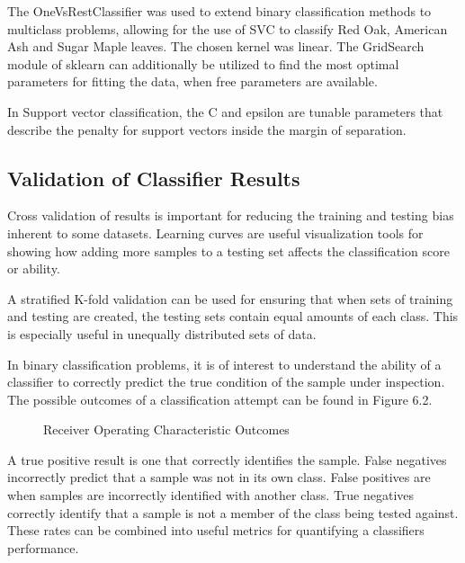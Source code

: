 %
The OneVsRestClassifier was used to extend binary classification methods to multiclass problems, allowing for the use of SVC to classify Red Oak, American Ash and Sugar Maple leaves.  The chosen kernel was linear.  The GridSearch module of sklearn can additionally be utilized to find the most optimal parameters for fitting the data, when free parameters are available.

In Support vector classification, the C and epsilon are tunable parameters that describe the penalty for support vectors inside the margin of separation.
\subsection{Validation of Classifier Results}
Cross validation of results is important for reducing the training and testing bias inherent to some datasets.  Learning curves are useful visualization tools for showing how adding more samples to a testing set affects the classification score or ability.

A stratified K-fold validation can be used for ensuring that when sets of training and testing are created, the testing sets contain equal amounts of each class.  This is especially useful in unequally distributed sets of data.

In binary classification problems, it is of interest to understand the ability of a classifier to correctly predict the true condition of the sample under inspection.  The possible outcomes of a classification attempt can be found in Figure 6.2.
\begin{figure}
    \begin{center}
    \end{center}
    \caption{Receiver Operating Characteristic Outcomes}
    \label{fig:polarization}
\end{figure}
A true positive result is one that correctly identifies the sample.  False negatives incorrectly predict that a sample was not in its own class.  False positives are when samples are incorrectly identified with another class.  True negatives correctly identify that a sample is not a member of the class being tested against.   These rates can be combined into useful metrics for quantifying a classifiers performance.

